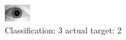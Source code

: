 \begin{figure}[h!]
\begin{center}
\includegraphics[width=0.60\columnwidth]{figures/ID1615_class_3_target_2.png}
\end{center}
\caption{ Classification: 3 actual target: 2}
\label{fig:ID1615_class_3_target_2}
\end{figure}
